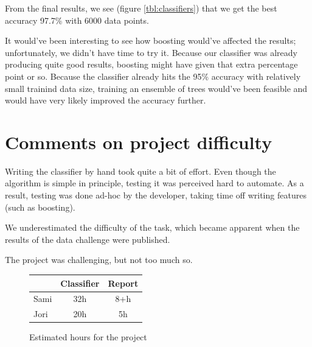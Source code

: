 \documentclass[a4paper,10pt]{article}
\begin{document}
From the final results, we see (figure \ref{tbl:classifiers}) that we
get the best accuracy 97.7\% with 6000 data points.

It would've been interesting to see how
boosting\cite[p. 360]{alpaydin2004} would've affected the results;
unfortunately, we didn't have time to try it.  Because our classifier
was already producing quite good results, boosting might have given that
extra percentage point or so.  Because the classifier already hits the
95\% accuracy with relatively small trainind data size, training an
ensemble of trees would've been feasible and would have very likely
improved the accuracy further.

\section{Comments on project difficulty}

Writing the classifier by hand took quite a bit of effort.  Even though
the algorithm is simple in principle, testing it was perceived hard to
automate.  As a result, testing was done ad-hoc by the developer, taking
time off writing features (such as boosting).

We underestimated the difficulty of the task, which became apparent when
the results of the data challenge were published.

The project was challenging, but not too much so.

\begin{figure}
  \centering
\begin{tabular}{|l|c|c|}
\hline
 & Classifier & Report \\ \hline
Sami & 32h & 8+h \\ %
Jori & 20h & 5h  \\ %
\hline
\end{tabular}
  \caption{Estimated hours for the project}
  \label{tbl:effort-estimate} 
\end{figure}
\end{document}
